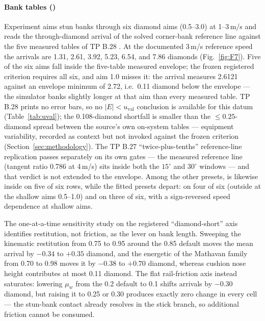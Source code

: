 \paragraph{Bank tables ()}
Experiment  aims stun banks through six diamond aims (0.5--3.0)
at 1--3\,m/s and reads the through-diamond arrival of the solved
corner-bank reference line against the five measured tables of TP B.28
\citep{alciatore_tp_b28}. At the documented 3\,m/s reference speed the
 arrivals are 1.31, 2.61, 3.92, 5.23, 6.54, and
7.86 diamonds (Fig.~\ref{fig:F7}). Five of the six aims fall inside the
five-table measured envelope; the frozen registered criterion requires all
six, and aim 1.0 misses it: the arrival measures 2.6121 against an envelope
minimum of 2.72, i.e.\ 0.11 diamond below the envelope --- the simulator
banks slightly longer at that aim than every measured table. TP B.28 prints no error bars, so
no $|E| < u_{\mathrm{val}}$ conclusion is available for this datum
(Table~\ref{tab:uval}); the 0.108-diamond shortfall is smaller than the
${\leq}0.25$-diamond spread between the source's own on-system tables
--- equipment variability, recorded as context but not invoked against
the frozen criterion (Section~\ref{sec:methodology}). The
TP B.27 ``twice-plus-tenths'' reference-line replication passes separately
on its own gates --- the measured reference line (tangent ratio 0.786 at
4\,m/s) sits inside both the $15^\circ$ and $30^\circ$ windows
\citep{alciatore_tp_catalog} --- and that verdict is not extended to the
envelope. Among the other presets,  is likewise
inside on five of six rows, while the fitted presets depart:
 on four of six (outside at the shallow aims
0.5--1.0) and  on
three of six, with a sign-reversed speed dependence at shallow aims.

The one-at-a-time sensitivity study on the registered ``diamond-short''
axis identifies restitution, not friction, as the lever on bank length.
Sweeping the kinematic restitution  from 0.75 to 0.95 around the
0.85 default moves the mean arrival by $-0.34$ to $+0.35$ diamond, and the
energetic  of the Mathavan family from 0.70 to 0.98 moves it by
$-0.38$ to $+0.70$ diamond, whereas cushion nose height contributes at most
0.11 diamond. The flat rail-friction axis instead saturates: lowering
$\mu_w$ from the 0.2 default to 0.1 shifts arrivals by $-0.30$ diamond, but
raising it to 0.25 or 0.30 produces exactly zero change in every cell ---
the stun-bank contact already resolves in the stick branch, so additional
friction cannot be consumed.

